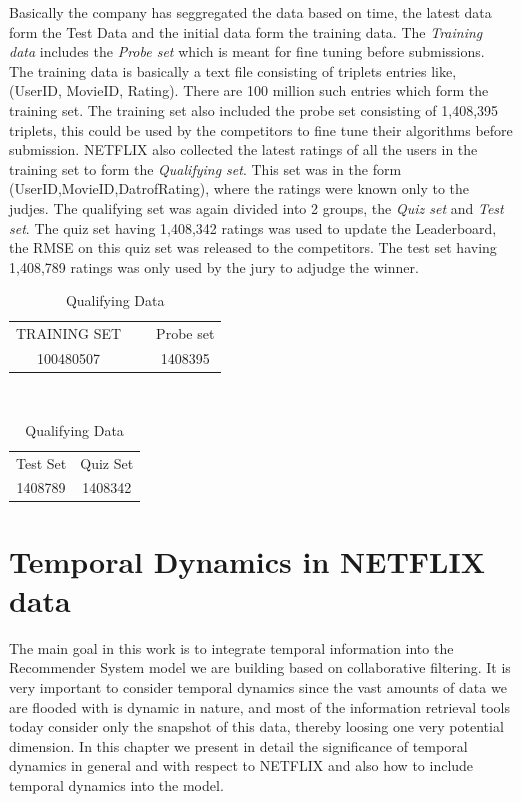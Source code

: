  Basically the company has seggregated the data based on time, the latest data
form the Test Data and the initial data form the training data. The
\emph{Training data} includes the \emph{Probe set} which is meant for fine
tuning before submissions. The training data is basically a text file consisting
of triplets entries like, (UserID, MovieID, Rating). There are 100 million such
entries which form the training set. The training set also included the probe
set consisting of 1,408,395 triplets, this could be used by the competitors to
fine tune their algorithms before submission. NETFLIX also collected the latest
ratings of all the users in the training set to form the \emph{Qualifying set}.
This set was in the form (UserID,MovieID,DatrofRating), where the ratings were
known only to the judjes. The qualifying set was again divided into 2 groups,
the \emph{Quiz set} and \emph{Test set}. The quiz set having 1,408,342 ratings
was used to update the Leaderboard, the RMSE on this quiz set was released to
the competitors. The test set having 1,408,789 ratings was only used by the jury
to adjudge the winner. \cite{Bennett07thenetflix}\\



 
\begin{table}
\begin{center}
    \begin{tabular}{|ccc|}
        \hline
         TRAINING SET  & ~ &  Probe set  \\ 
         100480507 & ~ & 1408395   \\ \hline       
    \end{tabular} \\
    \caption[]{Training Data}
     \begin{tabular}{|c|c|}
       \hline
       Test Set  & Quiz Set  \\ 
       1408789 & 1408342 \\ \hline       
    \end{tabular}
    \caption{Qualifying Data}     
\end{center}
\end{table}

\section{Temporal Dynamics in NETFLIX data}
The main goal in this work is to integrate temporal information into the
Recommender System model we are building based on collaborative filtering. It is
very important to consider temporal dynamics since the vast amounts of data we
are flooded with is dynamic in nature, and most of the information retrieval
tools today consider only the snapshot of this data, thereby loosing one very
potential dimension. In this chapter we present in detail the significance of
temporal dynamics in general and with respect to NETFLIX and also how to include
temporal dynamics into the model. \\


